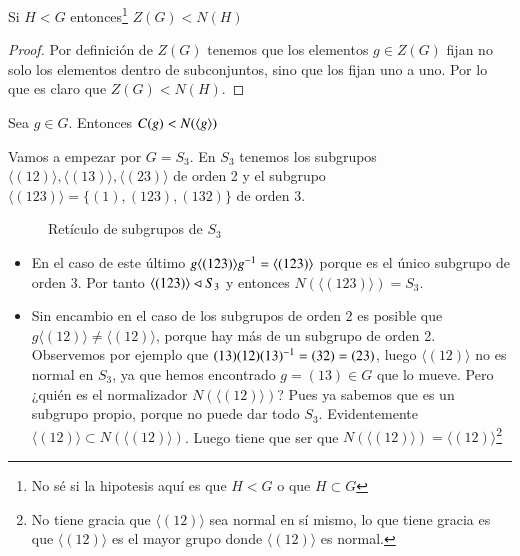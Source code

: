 \begin{pro}
	Si $H < G$ entonces\footnote{No sé si la hipotesis aquí es que $H < G$ o que $H \subset G$} $Z(G) < N(H)$
\end{pro}

\begin{proof}
	Por definición de $Z(G)$ tenemos que los elementos $g \in Z(G)$ fijan no solo los elementos dentro de subconjuntos, sino que los fijan uno a uno. Por lo que es claro que $Z(G) < N(H)$. 
\end{proof}

\begin{pro}
	\label{pro:centralizadorsubgruponormalizador}
	Sea $g \in G$. Entonces $C(g) < N(\langle g\rangle)$
\end{pro}

\begin{ej}
	Vamos a empezar por $G = S_3$. En $S_3$ tenemos los subgrupos $\langle (12) \rangle, \langle (13) \rangle, \langle (23) \rangle$ de orden 2 y el subgrupo $\langle (123) \rangle = \{(1), (123), (132)\}$ de orden 3.
	
	\begin{figure}[h]
		\centering
		\caption{Retículo de subgrupos de $S_3$}
		\label{fig:reticulos3}
	\end{figure}
	\begin{itemize}
		\item En el caso de este último $g\langle (123) \rangle g^{-1} = \langle (123) \rangle$ porque es el único subgrupo de orden 3. Por tanto $\langle (123) \rangle \lhd S_3$ y entonces $N(\langle (123) \rangle) = S_3$.
		\item Sin encambio en el caso de los subgrupos de orden $2$ es posible que $g\langle (12) \rangle \neq \langle (12) \rangle$, porque hay más de un subgrupo de orden 2. Observemos por ejemplo que $(13)(12)(13)^{-1} = (32) = (23)$, luego $\langle (12) \rangle$ no es normal en $S_3$, ya que hemos encontrado $g = (13) \in G$ que lo mueve. Pero ¿quién es el normalizador $N(\langle (12) \rangle)$? Pues ya sabemos que es un subgrupo propio, porque no puede dar todo $S_3$. Evidentemente $\langle (12) \rangle \subset N(\langle (12) \rangle)$. Luego tiene que ser que $N(\langle (12) \rangle) = \langle (12) \rangle$\footnote{No tiene gracia que $\langle (12) \rangle$ sea normal en sí mismo, lo que tiene gracia es que $\langle (12) \rangle$ es el mayor grupo donde $\langle (12) \rangle$ es normal.} 
	\end{itemize}
\end{ej}

